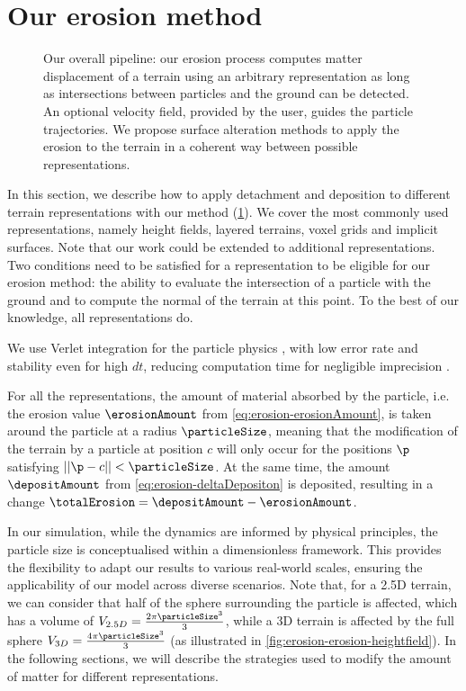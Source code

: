 \section{Our erosion method}
\label{sec:erosion-application_on_representations}

\begin{figure}
    \centering
    \caption{Our overall pipeline: our erosion process computes matter displacement of a terrain using an arbitrary representation as long as intersections between particles and the ground can be detected. An optional velocity field, provided by the user, guides the particle trajectories. We propose surface alteration methods to apply the erosion to the terrain in a coherent way between possible representations.}
    \label{fig:erosion-figure_pipeline}
\end{figure}

In this section, we describe how to apply detachment and deposition to different terrain representations with our method (\cref{fig:erosion-figure_pipeline}). We cover the most commonly used representations, namely height fields, layered terrains, voxel grids and implicit surfaces. Note that our work could be extended to additional representations. Two conditions need to be satisfied for a representation to be eligible for our erosion method: the ability to evaluate the intersection of a particle with the ground and to compute the normal of the terrain at this point. To the best of our knowledge, all representations do.

We use Verlet integration for the particle physics \cite{Verlet1967}, with low error rate and stability even for high $dt$, reducing computation time for negligible imprecision \cite{Baraff1998, Swope1982}.

For all the representations, the amount of material absorbed by the particle, i.e. the erosion value $\erosionAmount$ from \eqref{eq:erosion-erosionAmount}, is taken around the particle at a radius $\particleSize$, meaning that the modification of the terrain by a particle at position $c$ will only occur for the positions $\p$ satisfying $||\p - c|| < \particleSize$. At the same time, the amount $\depositAmount$ from \eqref{eq:erosion-deltaDepositon} is deposited, resulting in a change $\totalErosion = \depositAmount - \erosionAmount$.

In our simulation, while the dynamics are informed by physical principles, the particle size is conceptualised within a dimensionless framework. This provides the flexibility to adapt our results to various real-world scales, ensuring the applicability of our model across diverse scenarios.  
Note that, for a 2.5D terrain, we can consider that half of the sphere surrounding the particle is affected, which has a volume of $V_{2.5D} = \frac{2 \pi \particleSize^3}{3}$, while a 3D terrain is affected by the full sphere $V_{3D} = \frac{4 \pi \particleSize^3}{3}$ (as illustrated in \cref{fig:erosion-erosion-heightfield}). In the following sections, we will describe the strategies used to modify the amount of matter for different representations. 

